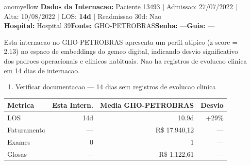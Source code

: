 \documentclass[a4paper,10pt]{article}
\begin{document}
\begin{anomalycard}[Internacao 14520 | GHO-PETROBRAS | MODERADO (z=2.13)]{anomyellow}
\textbf{Dados da Internacao:} Paciente 13493 $\mid$ Admissao: 27/07/2022 $\mid$ Alta: 10/08/2022 $\mid$ LOS: \textbf{14d} $\mid$ Readmissao 30d: Nao\\
\textbf{Hospital:} Hospital 39\quad\textbf{Fonte:} GHO-PETROBRAS\quad\textbf{Senha:} ---\quad\textbf{Guia:} ---\\
\vspace{2pt}\begin{tcolorbox}[colback=severityred!20,colframe=anomyellow,title={\textbf{Interpretacao de Negocio}},fonttitle=\bfseries\small,left=4pt,right=4pt,top=3pt,bottom=3pt]
{\small Esta internacao no GHO-PETROBRAS apresenta um perfil atipico (z-score = 2.13) no espaco de embeddings do gemeo digital, indicando desvio significativo dos padroes operacionais e clinicos habituais. Nao ha registros de evolucao clinica em 14 dias de internacao.}
\end{tcolorbox}
\begin{tcolorbox}[colback=severityyellow!30,colframe=anomorange,title={\textbf{Recomendacoes Especificas}},fonttitle=\bfseries\small,left=4pt,right=4pt,top=3pt,bottom=3pt]
\begin{enumerate}[nosep,leftmargin=16pt]
\item {\small Verificar documentacao --- 14 dias sem registros de evolucao clinica}
\end{enumerate}
\end{tcolorbox}
\begin{center}\begin{tabular}{l r r r}\toprule\textbf{Metrica} & \textbf{Esta Intern.} & \textbf{Media GHO-PETROBRAS} & \textbf{Desvio} \\\midrule
LOS & 14d & 10.9d & +29\% \\
Faturamento & --- & R\$ 17.940,12 & --- \\
Exames & 0 & 1 & --- \\
Glosas & --- & R\$ 1.122,61 & --- \\
\bottomrule\end{tabular}\end{center}


\end{anomalycard}
\end{document}
